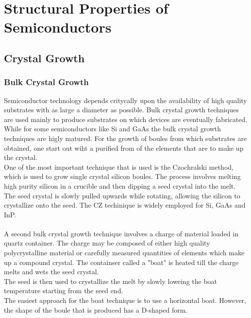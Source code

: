 \chapter{Structural Properties of Semiconductors}

\section{Crystal Growth}
\subsection{Bulk Crystal Growth}
Semiconductor technology depends critycally upon the availability  of high quality substrates with as large a diameter as possible. Bulk crystal growth techniques are used mainly
to produce substrates on which devices are eventually fabricated. While for some semiconductors like Si and GaAs the bulk crystal growth techniques are higly matured.
For the growth of boules from which substrates are obtained, one start out wiht a purified from of the elements that are to make up the crystal. \\
One of the most important technique that is used is the Czochralski method, which is used to grow single crystal silicon boules. The process involves melting high purity silicon in a crucible and then dipping a seed crystal into the melt. The seed crystal is slowly pulled upwards while rotating, allowing the silicon to crystallize onto the seed.
The CZ techinique is widely employed for Si, GaAs and InP.\\\\
A second bulk crystal growth technique involves a charge of material loaded in quartz container. The charge may be composed of either high quality polycrystalline material or carefully measured quantities of elements which make up a compound
crystal. The containser called a "boat" is heated till the charge melts and wets the seed crystal.\\
The seed is then used to crystallize the melt by slowly loweing the boat temperature starting from the seed end.\\
The easiest approach for the boat technique is to use a horizontal boat. However, the shape of the boule that is produced has a D-shaped form.
